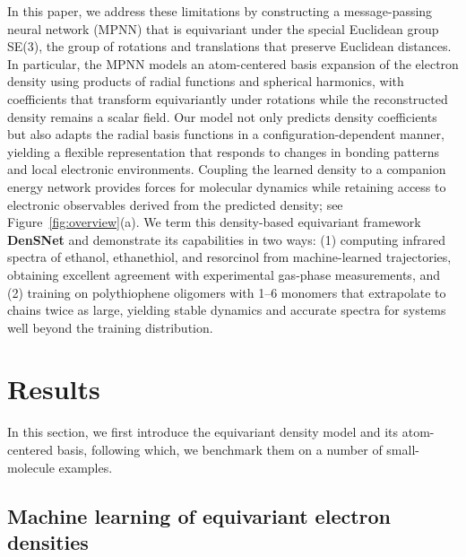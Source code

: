 \documentclass[12pt]{article}
\begin{document}
In this paper, we address these limitations by constructing a message-passing neural network (MPNN) that is equivariant under the special Euclidean group SE(3), the group of rotations and translations that preserve Euclidean distances.~\cite{thomas2018tensor, weiler20183d}  
In particular, the MPNN models an atom-centered basis expansion of the electron density using products of radial functions and spherical harmonics, with coefficients that transform equivariantly under rotations while the reconstructed density remains a scalar field. 
Our model not only predicts density coefficients but also adapts the radial basis functions in a configuration-dependent manner, yielding a flexible representation that responds to changes in bonding patterns and local electronic environments. 
Coupling the learned density to a companion energy network provides forces for molecular dynamics while retaining access to electronic observables derived from the predicted density; see Figure~\ref{fig:overview}(a). 
We term this density-based equivariant framework \textbf{DenSNet} and demonstrate its capabilities in two ways: (1) computing infrared spectra of ethanol, ethanethiol, and resorcinol from machine-learned trajectories, obtaining excellent agreement with experimental gas-phase measurements, and (2) training on polythiophene oligomers with 1--6 monomers that extrapolate to chains twice as large, yielding stable dynamics and accurate spectra for systems well beyond the training distribution.

\FloatBarrier
\section{Results}\label{sec:results}

In this section, we first introduce the equivariant density model and its atom-centered basis, following which, we benchmark them on a number of small-molecule examples.

\subsection{Machine learning of equivariant electron densities}\label{sec:equiv_dens}
\end{document}
